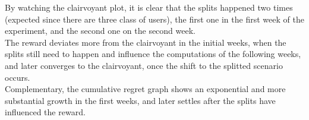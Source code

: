 By watching the clairvoyant plot, it is clear that the splits happened two times (expected since there are three class of users), the first one in the first week of the experiment, and the second one on the second week. \\The reward deviates more from the clairvoyant in the initial weeks, when the splits still need to happen and influence the computations of the following weeks, and later converges to the clairvoyant, once the shift to the splitted scenario occurs. \\Complementary, the cumulative regret graph shows an exponential and more substantial growth in the first weeks, and later settles after the splits have influenced the reward.
